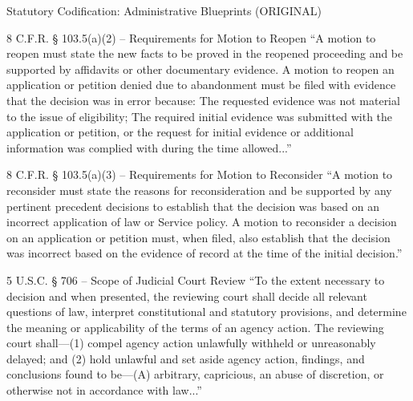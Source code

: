 \documentclass[11pt]{beamer}
\begin{document}
	\begin{frame}[allowframebreaks]{Statutory Codification: Administrative Blueprints (ORIGINAL)}
		\scriptsize
		\begin{block}{8 C.F.R. § 103.5(a)(2) -- Requirements for Motion to Reopen}
			``A motion to reopen must state the new facts to be proved in the reopened proceeding and be supported by affidavits or other documentary evidence. A motion to reopen an application or petition denied due to abandonment must be filed with evidence that the decision was in error because: The requested evidence was not material to the issue of eligibility; The required initial evidence was submitted with the application or petition, or the request for initial evidence or additional information was complied with during the time allowed...''
		\end{block}
		\framebreak
		\begin{block}{8 C.F.R. § 103.5(a)(3) -- Requirements for Motion to Reconsider}
			``A motion to reconsider must state the reasons for reconsideration and be supported by any pertinent precedent decisions to establish that the decision was based on an incorrect application of law or Service policy. A motion to reconsider a decision on an application or petition must, when filed, also establish that the decision was incorrect based on the evidence of record at the time of the initial decision.''
		\end{block}
		\framebreak
		\begin{block}{5 U.S.C. § 706 -- Scope of Judicial Court Review}
			``To the extent necessary to decision and when presented, the reviewing court shall decide all relevant questions of law, interpret constitutional and statutory provisions, and determine the meaning or applicability of the terms of an agency action. The reviewing court shall—(1) compel agency action unlawfully withheld or unreasonably delayed; and (2) hold unlawful and set aside agency action, findings, and conclusions found to be—(A) arbitrary, capricious, an abuse of discretion, or otherwise not in accordance with law...''
		\end{block}
	\end{frame}
	
	
\end{document}
